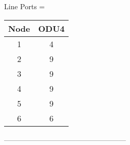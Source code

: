 \vspace{15pt}


Line Ports = \\


\begin{tabular}{|c|c|}
  \hline
  Node & ODU4 \\
  \hline\hline
  1 & 4 \\
  2 & 9 \\
  3 & 9 \\
  4 & 9 \\
  5 & 9 \\
  6 & 6 \\
  \hline
\end{tabular}

\vspace{11pt}

---------------------------------------------------\\


